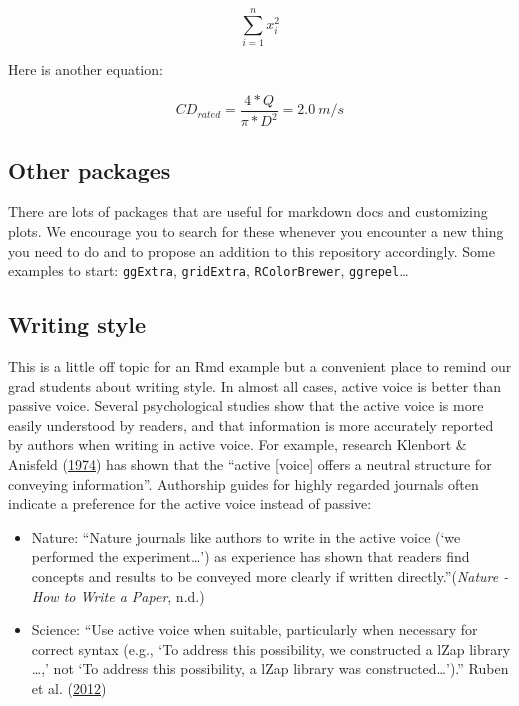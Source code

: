 \documentclass[]{elsarticle} %
\providecommand{\tightlist}{%
  \setlength{\itemsep}{0pt}\setlength{\parskip}{0pt}}
\begin{document}
\[\sum_{i=1}^{n}{x_i^2}\]

Here is another equation:

\[ CD_{rated} = \frac{4*Q}{\pi*D^2} = 2.0~m/s\]

\hypertarget{other-packages}{%
\subsection{Other packages}\label{other-packages}}

There are lots of packages that are useful for markdown docs and customizing plots. We encourage you to search for these whenever you encounter a new thing you need to do and to propose an addition to this repository accordingly. Some examples to start: \texttt{ggExtra}, \texttt{gridExtra}, \texttt{RColorBrewer}, \texttt{ggrepel}\ldots{}

\hypertarget{writing-style}{%
\subsection{Writing style}\label{writing-style}}

This is a little off topic for an Rmd example but a convenient place to remind our grad students about writing style. In almost all cases, active voice is better than passive voice. Several psychological studies show that the active voice is more easily understood by readers, and that information is more accurately reported by authors when writing in active voice. For example, research Klenbort \& Anisfeld (\protect\hyperlink{ref-klenbortMarkednessPerspectiveInterpretation1974}{1974}) has shown that the ``active {[}voice{]} offers a neutral structure for conveying information''. Authorship guides for highly regarded journals often indicate a preference for the active voice instead of passive:

\begin{itemize}
\tightlist
\item
  Nature: ``Nature journals like authors to write in the active voice (`we performed the experiment\ldots{}') as experience has shown that readers find concepts and results to be conveyed more clearly if written directly.''(\emph{Nature - How to Write a Paper}, n.d.)
\item
  Science: ``Use active voice when suitable, particularly when necessary for correct syntax (e.g., `To address this possibility, we constructed a lZap library \ldots{},' not `To address this possibility, a lZap library was constructed\ldots{}').'' Ruben et al. (\protect\hyperlink{ref-rubenHowWriteScientist2012}{2012})
\end{itemize}
\end{document}
